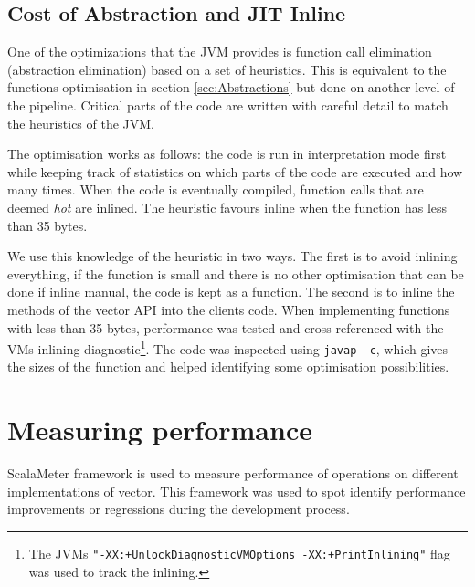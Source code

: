 \subsection{Cost of Abstraction and JIT Inline}
One of the optimizations that the JVM provides is function call elimination (abstraction elimination) based on a set of heuristics. This is equivalent to the functions optimisation in section \ref{sec:Abstractions} but done on another level of the pipeline. Critical parts of the code are written with careful detail to match the heuristics of the JVM.

The optimisation works as follows: the code is run in interpretation mode first while keeping track of statistics on which parts of the code are executed and how many times. When the code is eventually compiled, function calls that are deemed \emph{hot} are inlined. The heuristic favours inline when the function has less than 35 bytes. 

We use this knowledge of the heuristic in two ways. The first is to avoid inlining everything, if the function is small and there is no other optimisation that can be done if inline manual, the code is kept as a function. The second is to inline the methods of the vector API into the clients code. When implementing functions with less than 35 bytes, performance was tested and cross referenced with the VMs inlining diagnostic\footnote{The JVMs \texttt{"-XX:+UnlockDiagnosticVMOptions -XX:+PrintInlining"} flag was used to track the inlining.}. The code was inspected using \texttt{javap -c}, which gives the sizes of the function and helped identifying some optimisation possibilities.

\clearpage
\section{Measuring performance}
ScalaMeter framework\cite{scalameter} is used to measure performance of operations on different implementations of vector. This framework was used to spot identify performance improvements or regressions during the development process. 

